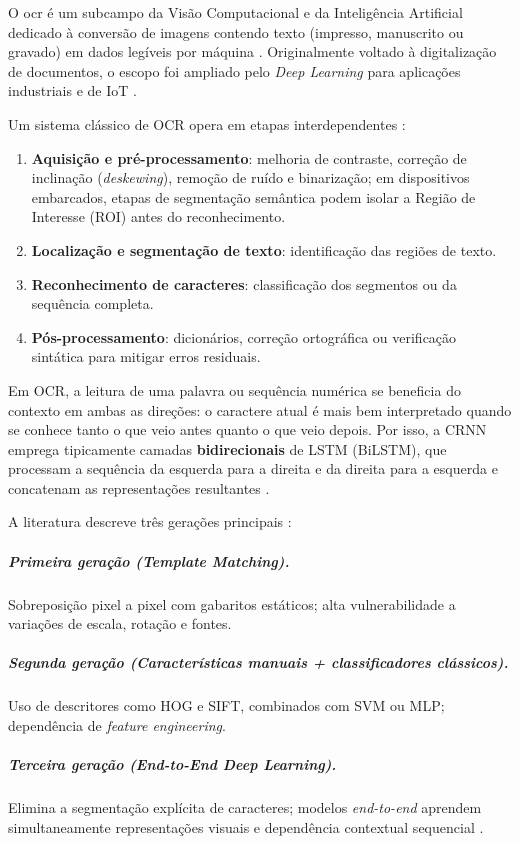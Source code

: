 O \gls{ocr} é um subcampo da Visão Computacional e da Inteligência Artificial 
dedicado à conversão de imagens contendo texto (impresso, manuscrito ou gravado) 
em dados legíveis por máquina \cite{chen2021survey}. 
Originalmente voltado à digitalização de documentos, 
o escopo foi ampliado pelo \textit{Deep Learning} 
para aplicações industriais e de IoT \cite{jawas2018water}.

Um sistema clássico de OCR opera em etapas interdependentes \cite{chen2021survey}:
\begin{enumerate}
    \item \textbf{Aquisição e pré-processamento}: melhoria de contraste, correção de inclinação (\textit{deskewing}), remoção de ruído e binarização; em dispositivos embarcados, etapas de segmentação semântica podem isolar a Região de Interesse (ROI) antes do reconhecimento.
    \item \textbf{Localização e segmentação de texto}: identificação das regiões de texto.
    \item \textbf{Reconhecimento de caracteres}: classificação dos segmentos ou da sequência completa.
    \item \textbf{Pós-processamento}: dicionários, correção ortográfica ou verificação sintática para mitigar erros residuais.
\end{enumerate}

Em OCR, a leitura de uma palavra ou sequência numérica se beneficia do contexto em ambas as direções: o caractere atual é mais bem interpretado quando se conhece tanto o que veio antes quanto o que veio depois. 
Por isso, a CRNN emprega tipicamente camadas \textbf{bidirecionais} de LSTM (BiLSTM), que processam a sequência da esquerda para a direita e da direita para a esquerda e concatenam as representações resultantes \cite{shi2017crnn, hannun2017ctc}.


A literatura descreve três gerações principais \cite{chen2021survey}:

\subparagraph{Primeira geração (Template Matching).}
Sobreposição pixel a pixel com gabaritos estáticos; 
alta vulnerabilidade a variações de escala, rotação e fontes.

\subparagraph{Segunda geração (Características manuais + classificadores clássicos).}
Uso de descritores como HOG e SIFT, 
combinados com SVM ou MLP; dependência de \textit{feature engineering}.

\subparagraph{Terceira geração (End-to-End Deep Learning).}
Elimina a segmentação explícita de caracteres; 
modelos \textit{end-to-end} aprendem simultaneamente representações 
visuais e dependência contextual sequencial \cite{shi2017crnn}.
